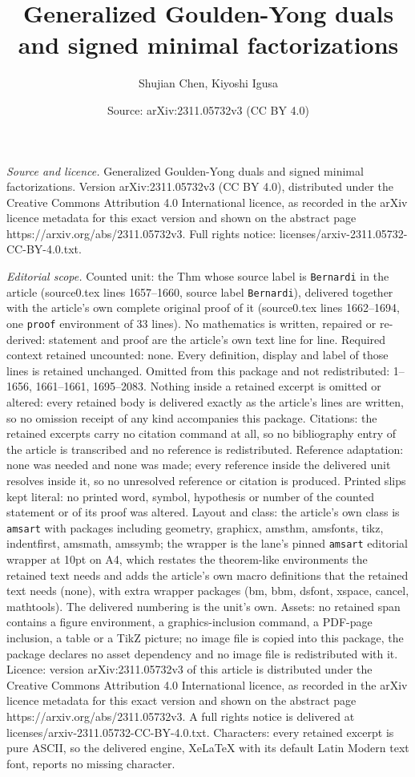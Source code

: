 \documentclass[10pt,a4paper]{amsart}
\title[Generalized Goulden-Yong duals and signed minimal factorizat]{Generalized Goulden-Yong duals and signed minimal factorizations}
\author{Shujian Chen, Kiyoshi Igusa}
\date{Source: arXiv:2311.05732v3 (CC BY 4.0)}
\begin{document}
\maketitle

\noindent\emph{Source and licence.} Generalized Goulden-Yong duals and signed minimal factorizations. Version arXiv:2311.05732v3 (CC BY 4.0), distributed under the Creative Commons Attribution 4.0 International licence, as recorded in the arXiv licence metadata for this exact version and shown on the abstract page https://arxiv.org/abs/2311.05732v3. Full rights notice: licenses/arxiv-2311.05732-CC-BY-4.0.txt.\par\smallskip

\noindent\textit{Editorial scope.} Counted unit: the Thm whose source label is \texttt{Bernardi} in the article (source0.tex lines 1657--1660, source label \texttt{Bernardi}), delivered together with the article's own complete original proof of it (source0.tex lines 1662--1694, one \texttt{proof} environment of 33 lines). No mathematics is written, repaired or re-derived: statement and proof are the article's own text line for line. Required context retained uncounted: none. Every definition, display and label of those lines is retained unchanged. Omitted from this package and not redistributed: 1--1656, 1661--1661, 1695--2083. Nothing inside a retained excerpt is omitted or altered: every retained body is delivered exactly as the article's lines are written, so no omission receipt of any kind accompanies this package. Citations: the retained excerpts carry no citation command at all, so no bibliography entry of the article is transcribed and no reference is redistributed. Reference adaptation: none was needed and none was made; every reference inside the delivered unit resolves inside it, so no unresolved reference or citation is produced. Printed slips kept literal: no printed word, symbol, hypothesis or number of the counted statement or of its proof was altered. Layout and class: the article's own class is \texttt{amsart} with packages including geometry, graphicx, amsthm, amsfonts, tikz, indentfirst, amsmath, amssymb; the wrapper is the lane's pinned \texttt{amsart} editorial wrapper at 10pt on A4, which restates the theorem-like environments the retained text needs and adds the article's own macro definitions that the retained text needs (none), with extra wrapper packages (bm, bbm, dsfont, xspace, cancel, mathtools). The delivered numbering is the unit's own. Assets: no retained span contains a figure environment, a graphics-inclusion command, a PDF-page inclusion, a table or a TikZ picture; no image file is copied into this package, the package declares no asset dependency and no image file is redistributed with it. Licence: version arXiv:2311.05732v3 of this article is distributed under the Creative Commons Attribution 4.0 International licence, as recorded in the arXiv licence metadata for this exact version and shown on the abstract page https://arxiv.org/abs/2311.05732v3. A full rights notice is delivered at licenses/arxiv-2311.05732-CC-BY-4.0.txt. Characters: every retained excerpt is pure ASCII, so the delivered engine, XeLaTeX with its default Latin Modern text font, reports no missing character.
\end{document}
